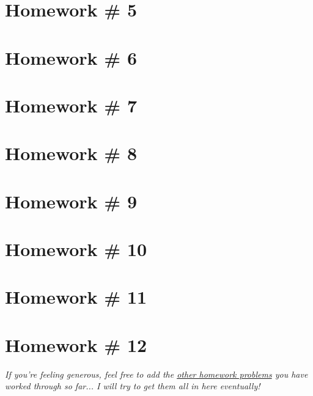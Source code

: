 \section*{Homework \# 5}

\section*{Homework \# 6}

\section*{Homework \# 7}

\section*{Homework \# 8}

\section*{Homework \# 9}

\section*{Homework \# 10}

\section*{Homework \# 11}

\section*{Homework \# 12}

\vspace{0.35cm}
\textit{If you're feeling generous, feel free to add the \href{https://www.dropbox.com/sh/759pwsjyc3ix0jy/AADBiIq0ZkDsvyEG6fMvSxJta/Abstract\%20Algebra\%20Homework\%20Sets?dl=0&subfolder_nav_tracking=1}{other homework problems} you have worked through so far... I will try to get them all in here eventually!}